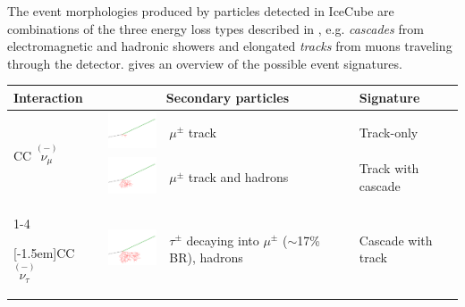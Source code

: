The event morphologies produced by particles detected in IceCube are combinations of the three energy loss types described in , e.g. \textit{cascades} from electromagnetic and hadronic showers and elongated \textit{tracks} from muons traveling through the detector.  gives an overview of the possible event signatures.

\begin{table}[h]
    \small
    \begin{center}
        \begin{tabular}{ m{1.8cm} m{2.0cm} m{3.0cm} m{1.8cm} }

            \hline\hline

            \textbf{Interaction} & \multicolumn{2}{c}{\textbf{Secondary particles}} &\textbf{Signature} \\

            \hline\hline

            \multirow{2}{*}[-1.5em]{CC $\overset{(-)}{\nu_\mu}$ }
            & \includegraphics[width=2cm]{figures/neutrinos_properties/interaction_schematics/numu_CC_muon_only.pdf} 
            & $\mu^\pm$ track 
            & Track-only \\

            \cmidrule{2-4} 
            &\includegraphics[width=2cm]{figures/neutrinos_properties/interaction_schematics/numu_CC_track_cascade.pdf}  
            & $\mu^\pm$ track and hadrons 
            & Track with cascade \\


            \cmidrule{1-4}

            \multirow{2}{*}[-1.5em]{CC $\overset{(-)}{\nu_\tau}$ }
            &\includegraphics[width=2cm]{figures/neutrinos_properties/interaction_schematics/nutau_CC_track_cascade.pdf} 
            & $\tau^\pm$ decaying into $\mu^\pm$ ($\sim$17\% BR), hadrons 
            & Cascade with track \\


\end{tabular}
\end{center}
\end{table}
